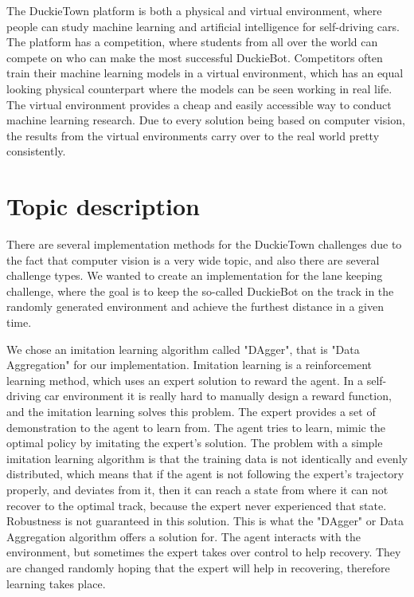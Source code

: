 \documentclass{article}
\begin{document}
The DuckieTown platform is both a physical and virtual environment, where people can study machine learning and artificial intelligence for self-driving cars. The platform has a competition, where students from all over the world can compete on who can make the most successful DuckieBot. Competitors often train their machine learning models in a virtual environment, which has an equal looking physical counterpart where the models can be seen working in real life. The virtual environment provides a cheap and easily accessible way to conduct machine learning research. Due to every solution being based on computer vision, the results from the virtual environments carry over to the real world pretty consistently. \\


\section{Topic description}

There are several implementation methods for the DuckieTown challenges due to the fact that computer vision is a very wide topic, and also there are several challenge types. We wanted to create an implementation for the lane keeping challenge, where the goal is to keep the so-called DuckieBot on the track in the randomly generated environment and achieve the furthest distance in a given time.

We chose an imitation learning algorithm called "DAgger", that is "Data Aggregation" for our implementation. Imitation learning is a reinforcement learning method, which uses an expert solution to reward the agent. In a self-driving car environment it is really hard to manually design a reward function, and the imitation learning solves this problem. The expert provides a set of demonstration to the agent to learn from. The agent tries to learn, mimic the optimal policy by imitating the expert's solution. The problem with a simple imitation learning algorithm is that the training data is not identically and evenly distributed, which means that if the agent is not following the expert's trajectory properly, and deviates from it, then it can reach a state from where it can not recover to the optimal track, because the expert never experienced that state. Robustness is not guaranteed in this solution. This is what the "DAgger" or Data Aggregation algorithm offers a solution for. The agent interacts with the environment, but sometimes the expert takes over control to help recovery. They are changed randomly hoping that the expert will help in recovering, therefore learning takes place. 
\end{document}
